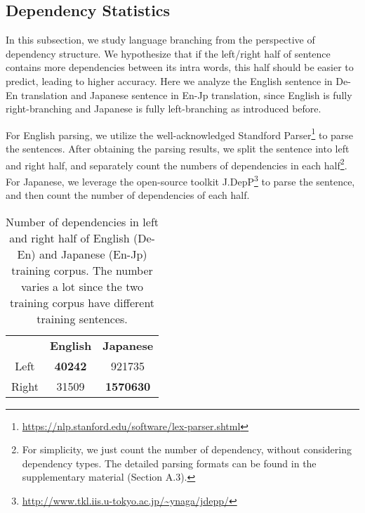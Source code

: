\documentclass[11pt,a4paper]{article}
\begin{document}
\subsection{Dependency Statistics}
In this subsection, we study language branching from the perspective of dependency structure.  We hypothesize that if the left/right half of sentence contains more dependencies between its intra words, this half should be easier to predict, leading to higher accuracy. Here we analyze the English sentence in De-En translation and Japanese sentence in En-Jp translation, since English is fully right-branching and Japanese is fully left-branching as introduced before.


For English parsing, we utilize the well-acknowledged Standford Parser\footnote{\url{https://nlp.stanford.edu/software/lex-parser.shtml}} to parse the sentences. After obtaining the parsing results, we split the sentence into left and right half, and separately count the numbers of dependencies in each half\footnote{For simplicity, we just count the number of dependency, without considering dependency types. The detailed parsing formats can be found in the supplementary material (Section A.3).}. For Japanese, we leverage the open-source toolkit J.DepP\footnote{\url{http://www.tkl.iis.u-tokyo.ac.jp/~ynaga/jdepp/}} to parse the sentence, and then count the number of dependencies of each half.



\begin{table}[tbp]
\small
\centering %
\begin{tabular}{ c  c  c  } %
\toprule %
  & \textbf{English} & \textbf{Japanese} \\
\cmidrule{2-3}
Left & \textbf{40242} & 921735 \\
Right  & 31509 & \textbf{1570630} \\
\bottomrule
\end{tabular}
\caption{Number of dependencies in left and right half of English (De-En) and Japanese (En-Jp) training corpus. The number varies a lot since the two training corpus have different training sentences.}
\label{parsing}
\end{table}
\end{document}

